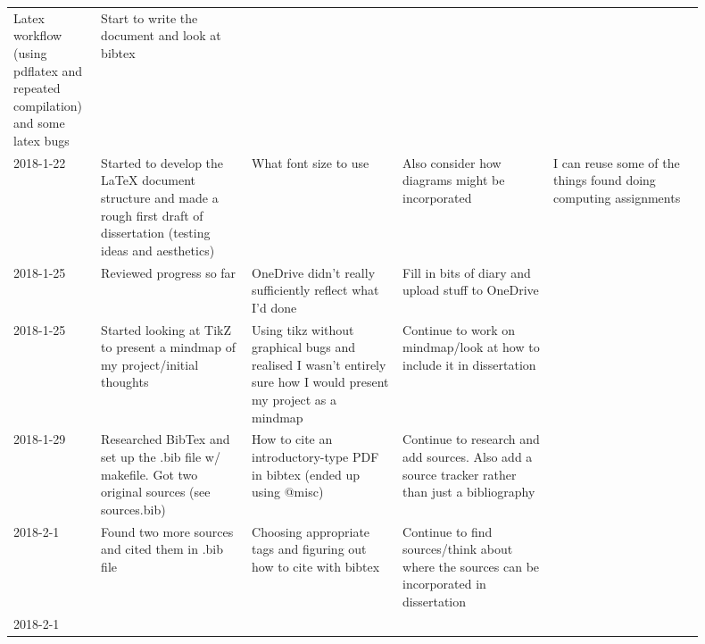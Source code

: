 \documentclass{article}
\begin{document}
\begin{center}
{\begin{longtable}{p{0.1\linewidth} p{0.2\linewidth} p{0.2\linewidth} p{0.2\linewidth} p{0.2\linewidth}}
    Latex workflow (using pdflatex and repeated compilation) and some latex
    bugs &

    Start to write the document and look at bibtex &

    \\ 2018-1-22 &

    Started to develop the LaTeX document structure and made a rough first
    draft of dissertation (testing ideas and aesthetics) &

    What font size to use &

    Also consider how diagrams might be incorporated &

    I can reuse some of the things found doing computing assignments \\
    2018-1-25 &

    Reviewed progress so far &

    OneDrive didn't really sufficiently reflect what I'd done &

    Fill in bits of diary and upload stuff to OneDrive &

    \\ 2018-1-25 &

    Started looking at TikZ to present a mindmap of my project/initial thoughts
    &

    Using tikz without graphical bugs and realised I wasn't entirely sure how I
    would present my project as a mindmap &

    Continue to work on mindmap/look at how to include it in dissertation &

    \\ 2018-1-29 &

    Researched BibTex and set up the .bib file w/ makefile. Got two original
    sources (see sources.bib) &

    How to cite an introductory-type PDF in bibtex (ended up using @misc) &

    Continue to research and add sources. Also add a source tracker rather than
    just a bibliography &

    \\ 2018-2-1 &

    Found two more sources and cited them in .bib file &

    Choosing appropriate tags and figuring out how to cite with bibtex &

    Continue to find sources/think about where the sources can be incorporated
    in dissertation &

    \\ 2018-2-1 &


\end{longtable}}
\end{center}
\end{document}
